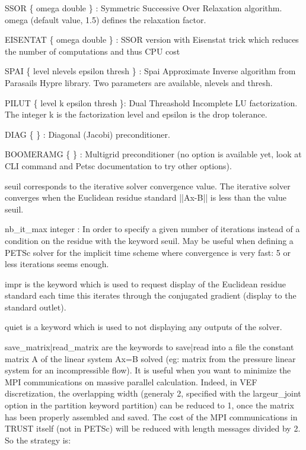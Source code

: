 	SSOR \{ omega double \} : Symmetric Successive Over Relaxation algorithm. omega (default value, 1.5) defines the relaxation factor. 

	EISENTAT \{ omega double \} : SSOR version with Eisenstat trick which reduces the number of computations and thus CPU cost

	SPAI \{ level nlevels epsilon thresh \} : Spai Approximate Inverse algorithm from Parasails Hypre library. Two parameters are available, nlevels and thresh.

	PILUT \{ level k epsilon thresh \}: Dual Threashold Incomplete LU factorization. The integer k is the factorization level and epsilon is the drop tolerance.

	DIAG \{  \} : Diagonal (Jacobi) preconditioner.

	BOOMERAMG \{ \} : Multigrid preconditioner (no option is available yet, look at CLI command and Petsc documentation to try other options).



seuil corresponds to the iterative solver convergence value. The iterative solver converges when the Euclidean residue standard ||Ax-B|| is less than the value seuil. 



nb\_it\_max integer : In order to specify a given number of iterations instead of a condition on the residue with the keyword seuil. May be useful when defining a PETSc solver for the implicit time scheme where convergence is very fast: 5 or less iterations seems enough.



impr is the keyword which is used to request display of the Euclidean residue standard each time this iterates through the conjugated gradient (display to the standard outlet).



quiet is a keyword which is used to not displaying any outputs of the solver.



save\_matrix|read\_matrix are the keywords to save|read into a file the constant matrix A of the linear system Ax=B solved (eg: matrix from the pressure linear system for an incompressible flow). It is useful when you want to minimize the MPI communications on massive parallel calculation. Indeed, in VEF discretization, the overlapping width (generaly 2, specified with the largeur\_joint option in the partition keyword partition) can be reduced to 1, once the matrix has been properly assembled and saved. The cost of the MPI communications in TRUST itself (not in PETSc) will be reduced with length messages divided by 2. So the strategy is:

